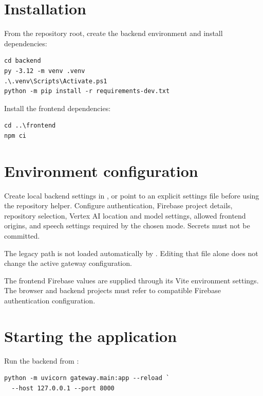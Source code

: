 \section{Installation}

From the repository root, create the backend environment and install dependencies:

\begin{lstlisting}[language={},caption={Backend dependency installation.}]
cd backend
py -3.12 -m venv .venv
.\.venv\Scripts\Activate.ps1
python -m pip install -r requirements-dev.txt
\end{lstlisting}

Install the frontend dependencies:

\begin{lstlisting}[language={},caption={Frontend dependency installation.}]
cd ..\frontend
npm ci
\end{lstlisting}

\section{Environment configuration}

Create local backend settings in , or point  to an explicit settings file before using the repository helper. Configure authentication, Firebase project details, repository selection, Vertex AI location and model settings, allowed frontend origins, and speech settings required by the chosen mode. Secrets must not be committed.

The legacy path  is not loaded automatically by . Editing that file alone does not change the active gateway configuration.

The frontend Firebase values are supplied through its Vite environment settings. The browser and backend projects must refer to compatible Firebase authentication configuration.

\section{Starting the application}

Run the backend from :

\begin{lstlisting}[language={},caption={Start the active FastAPI gateway.}]
python -m uvicorn gateway.main:app --reload `
  --host 127.0.0.1 --port 8000
\end{lstlisting}

